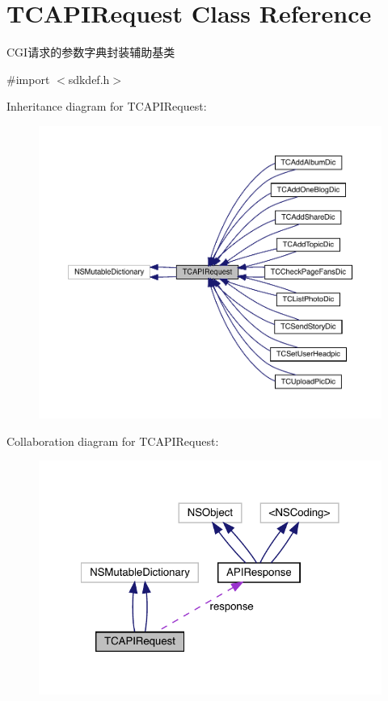 \hypertarget{interface_t_c_a_p_i_request}{}\section{T\+C\+A\+P\+I\+Request Class Reference}
\label{interface_t_c_a_p_i_request}


C\+G\+I请求的参数字典封装辅助基类  




{\ttfamily \#import $<$sdkdef.\+h$>$}



Inheritance diagram for T\+C\+A\+P\+I\+Request\+:\nopagebreak
\begin{figure}[H]
\begin{center}
\leavevmode
\includegraphics[width=350pt]{interface_t_c_a_p_i_request__inherit__graph}
\end{center}
\end{figure}


Collaboration diagram for T\+C\+A\+P\+I\+Request\+:\nopagebreak
\begin{figure}[H]
\begin{center}
\leavevmode
\includegraphics[width=322pt]{interface_t_c_a_p_i_request__coll__graph}
\end{center}
\end{figure}
